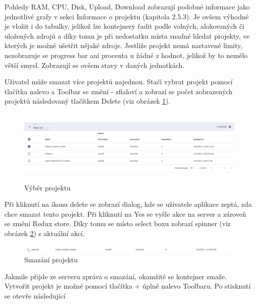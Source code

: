 \documentclass[a4paper,oneside,12pt]{report}
\begin{document}
Pohledy RAM, CPU, Disk, Upload, Download zobrazují podobné informace jako jednotlivé grafy v sekci Informace o projektu (kapitola 2.5.3).
Je ovšem výhodné je vložit i do tabulky, jelikož lze kontejnery řadit podle volných, alokovaných či uložených zdrojů a díky tomu je při nedostatku místa snadné hledat projekty, ve kterých je možné ušetřit nějaké zdroje.
Jestliže projekt nemá nastavené limity, nezobrazuje se progress bar ani procenta u žádné z hodnot, jelikož by to nemělo větší smysl. Zobrazují se ovšem stavy v daných jednotkách.

Uživatel může smazat více projektů najednou.
Stačí vybrat projekt pomocí tlačítka nalevo a Toolbar se změní - zfialoví a zobrazí se počet zobrazených projektů následovaný tlačítkem Delete (viz obrázek \ref{fig:projectSelect}).

\begin{figure}[h]
	\centering
	\includegraphics[height=3.6cm]{../img/project.png}
	\caption[Výběr projektu, vlastní tvorba]{Výběr projektu}
	\label{fig:projectSelect}
\end{figure}

Při kliknutí na ikonu delete se zobrazí dialog, kde se uživatele aplikace zeptá, zda chce smazat tento projekt.
Při kliknutí na Yes se vyšle akce na server a zároveň se změní Redux store. Díky tomu se místo select boxu zobrazí spinner (viz obrázek \ref{fig:detelePro}) s aktuální akcí.

\begin{figure}[h]
	\centering
	\includegraphics[height=0.35cm]{../img/deletingPro.png}
	\caption[Smazání projektu, vlastní tvorba]{Smazání projektu}
	\label{fig:detelePro}
\end{figure}

\newpage
Jakmile přijde ze serveru zpráva o smazání, okamžitě se kontejner smaže.
Vytvořit projekt je možné pomocí tlačítka + úplně nalevo Toolbaru. Po stisknutí se otevře následující
\end{document}
